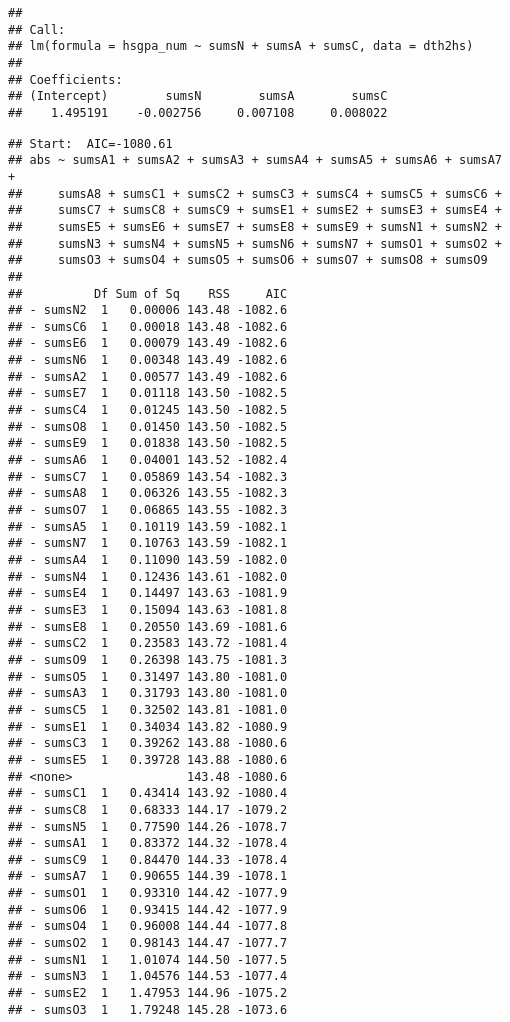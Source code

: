 \documentclass[,man,floatsintext]{apa6}
\begin{document}
\begin{verbatim}
## 
## Call:
## lm(formula = hsgpa_num ~ sumsN + sumsA + sumsC, data = dth2hs)
## 
## Coefficients:
## (Intercept)        sumsN        sumsA        sumsC  
##    1.495191    -0.002756     0.007108     0.008022
\end{verbatim}

\begin{verbatim}
## Start:  AIC=-1080.61
## abs ~ sumsA1 + sumsA2 + sumsA3 + sumsA4 + sumsA5 + sumsA6 + sumsA7 + 
##     sumsA8 + sumsC1 + sumsC2 + sumsC3 + sumsC4 + sumsC5 + sumsC6 + 
##     sumsC7 + sumsC8 + sumsC9 + sumsE1 + sumsE2 + sumsE3 + sumsE4 + 
##     sumsE5 + sumsE6 + sumsE7 + sumsE8 + sumsE9 + sumsN1 + sumsN2 + 
##     sumsN3 + sumsN4 + sumsN5 + sumsN6 + sumsN7 + sumsO1 + sumsO2 + 
##     sumsO3 + sumsO4 + sumsO5 + sumsO6 + sumsO7 + sumsO8 + sumsO9
## 
##          Df Sum of Sq    RSS     AIC
## - sumsN2  1   0.00006 143.48 -1082.6
## - sumsC6  1   0.00018 143.48 -1082.6
## - sumsE6  1   0.00079 143.49 -1082.6
## - sumsN6  1   0.00348 143.49 -1082.6
## - sumsA2  1   0.00577 143.49 -1082.6
## - sumsE7  1   0.01118 143.50 -1082.5
## - sumsC4  1   0.01245 143.50 -1082.5
## - sumsO8  1   0.01450 143.50 -1082.5
## - sumsE9  1   0.01838 143.50 -1082.5
## - sumsA6  1   0.04001 143.52 -1082.4
## - sumsC7  1   0.05869 143.54 -1082.3
## - sumsA8  1   0.06326 143.55 -1082.3
## - sumsO7  1   0.06865 143.55 -1082.3
## - sumsA5  1   0.10119 143.59 -1082.1
## - sumsN7  1   0.10763 143.59 -1082.1
## - sumsA4  1   0.11090 143.59 -1082.0
## - sumsN4  1   0.12436 143.61 -1082.0
## - sumsE4  1   0.14497 143.63 -1081.9
## - sumsE3  1   0.15094 143.63 -1081.8
## - sumsE8  1   0.20550 143.69 -1081.6
## - sumsC2  1   0.23583 143.72 -1081.4
## - sumsO9  1   0.26398 143.75 -1081.3
## - sumsO5  1   0.31497 143.80 -1081.0
## - sumsA3  1   0.31793 143.80 -1081.0
## - sumsC5  1   0.32502 143.81 -1081.0
## - sumsE1  1   0.34034 143.82 -1080.9
## - sumsC3  1   0.39262 143.88 -1080.6
## - sumsE5  1   0.39728 143.88 -1080.6
## <none>                143.48 -1080.6
## - sumsC1  1   0.43414 143.92 -1080.4
## - sumsC8  1   0.68333 144.17 -1079.2
## - sumsN5  1   0.77590 144.26 -1078.7
## - sumsA1  1   0.83372 144.32 -1078.4
## - sumsC9  1   0.84470 144.33 -1078.4
## - sumsA7  1   0.90655 144.39 -1078.1
## - sumsO1  1   0.93310 144.42 -1077.9
## - sumsO6  1   0.93415 144.42 -1077.9
## - sumsO4  1   0.96008 144.44 -1077.8
## - sumsO2  1   0.98143 144.47 -1077.7
## - sumsN1  1   1.01074 144.50 -1077.5
## - sumsN3  1   1.04576 144.53 -1077.4
## - sumsE2  1   1.47953 144.96 -1075.2
## - sumsO3  1   1.79248 145.28 -1073.6

\end{verbatim}
\end{document}
